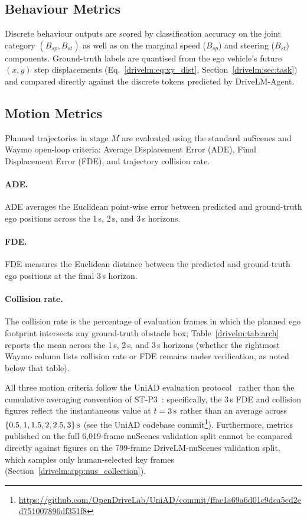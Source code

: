 \subsection{Behaviour Metrics}\label{drivelm:app:metrics_behavior}

Discrete behaviour outputs are scored by classification accuracy on the joint category $(B_{sp},B_{st})$ as well as on the marginal speed ($B_{sp}$) and steering ($B_{st}$) components. Ground-truth labels are quantised from the ego vehicle's future $(x,y)$ step displacements (Eq.~\eqref{drivelm:eq:xy_dist}, Section~\ref{drivelm:sec:task}) and compared directly against the discrete tokens predicted by DriveLM-Agent.

\subsection{Motion Metrics}\label{drivelm:app:metrics_motion}

Planned trajectories in stage $M$ are evaluated using the standard nuScenes and Waymo open-loop criteria: Average Displacement Error (ADE), Final Displacement Error (FDE), and trajectory collision rate.

\paragraph{ADE.}
ADE averages the Euclidean point-wise error between predicted and ground-truth ego positions across the 1\,s, 2\,s, and 3\,s horizons.

\paragraph{FDE.}
FDE measures the Euclidean distance between the predicted and ground-truth ego positions at the final 3\,s horizon.

\paragraph{Collision rate.}
The collision rate is the percentage of evaluation frames in which the planned ego footprint intersects any ground-truth obstacle box; Table~\ref{drivelm:tab:arch} reports the mean across the 1\,s, 2\,s, and 3\,s horizons (whether the rightmost Waymo column lists collision rate or FDE remains under verification, as noted below that table).

All three motion criteria follow the UniAD evaluation protocol~\cite{hu2023uniad} rather than the cumulative averaging convention of ST-P3~\cite{hu2022stp3}: specifically, the 3\,s FDE and collision figures reflect the instantaneous value at $t=3\text{\,s}$ rather than an average across $\{0.5, 1, 1.5, 2, 2.5, 3\}\text{\,s}$ (see the UniAD codebase commit\footnote{\raggedright\url{https://github.com/OpenDriveLab/UniAD/commit/ffac1a69a6d01c9dca5cd2ed751007896df351f8}}). Furthermore, metrics published on the full 6,019-frame nuScenes validation split cannot be compared directly against figures on the 799-frame DriveLM-nuScenes validation split, which samples only human-selected key frames (Section~\ref{drivelm:app:nus_collection}).

